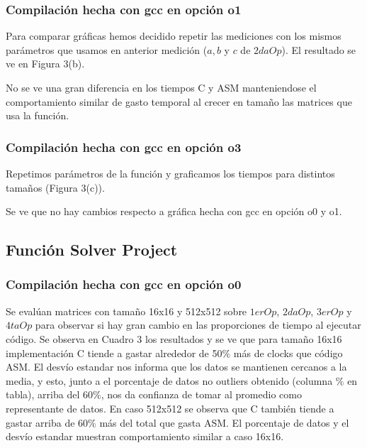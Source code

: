 \subsubsection{Compilación hecha con gcc en opción o1}
Para comparar gráficas hemos decidido repetir las mediciones con los mismos parámetros que usamos en anterior medición ($a, b$ y $c$ de $2daOp$). El resultado se ve en Figura 3(b).

  
No se ve una gran diferencia en los tiempos C y ASM manteniendose el comportamiento similar de gasto temporal al crecer en tamaño las matrices que usa la función.
  
\subsubsection{Compilación hecha con gcc en opción o3}
Repetimos parámetros de la función y graficamos los tiempos para distintos tamaños (Figura 3(c)).

  
Se ve que no hay cambios respecto a gráfica hecha con gcc en opción o0 y o1. 

\subsection{Función Solver Project}

\subsubsection{Compilación hecha con gcc en opción o0} 
Se evalúan matrices con tamaño 16x16 y 512x512 sobre $1erOp$, $2daOp$, $3erOp$ y $4taOp$ para observar si hay gran cambio en las proporciones de tiempo al ejecutar código. Se observa en Cuadro 3 los resultados y se ve que para tamaño 16x16 implementación C tiende a gastar alrededor de 50$\%$ más de clocks que código ASM.
El desvío estandar nos informa que los datos se mantienen cercanos a la media, y esto, junto a el porcentaje de datos no outliers obtenido (columna $\%$ en tabla), arriba del 60$\%$, nos da confianza de tomar al promedio como representante de datos. En caso 512x512 se observa que C también tiende a gastar arriba de 60$\%$ más del total que gasta ASM. El porcentaje de datos y el desvío estandar muestran comportamiento similar a caso 16x16. 
  
